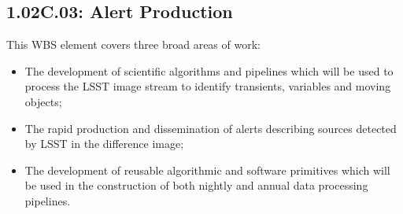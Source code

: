 \subsection*{1.02C.03: Alert Production}

This WBS element covers three broad areas of work:

\begin{itemize}

  \item{The development of scientific algorithms and pipelines which will be
  used to process the LSST image stream to identify transients, variables and
  moving objects;}

  \item{The rapid production and dissemination of alerts describing
  sources detected by LSST in the difference image;}

  \item{The development of reusable algorithmic and software primitives which
  will be used in the construction of both nightly and annual data processing
  pipelines.}

\end{itemize}
